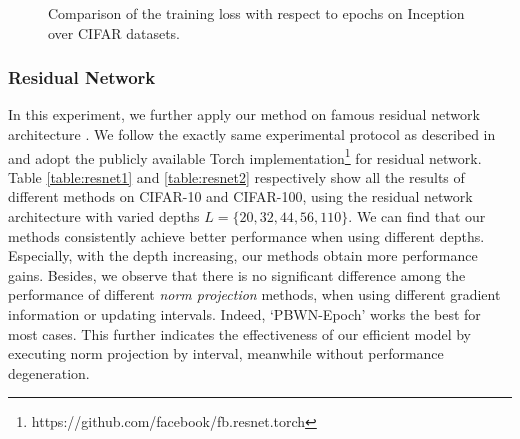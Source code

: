 \documentclass[twocolumn]{article}
\begin{document}
\begin{figure*}[t]
\centering
\hspace{-0.02\linewidth}
  \caption{\small Comparison of the training loss with respect to epochs on Inception over CIFAR datasets.}
  \label{fig:exp_Cifar}
    \vspace{-0.15in}
\end{figure*}


\subsubsection{Residual Network}
In this experiment, we further apply our method on famous residual network architecture \cite{2015_CVPR_He}. We follow the exactly same experimental protocol as described in \cite{2015_CVPR_He} and adopt the publicly available Torch implementation\footnote{https://github.com/facebook/fb.resnet.torch} for residual network. Table \ref{table:resnet1} and \ref{table:resnet2} respectively show all the results of different methods on CIFAR-10 and CIFAR-100, using the residual network architecture with varied depths $L=\{20, 32, 44, 56, 110 \}$. We can find that our methods consistently achieve better performance when using different depths. Especially, with the depth increasing, our methods obtain more performance gains. Besides, we observe that there is no significant difference among the performance of different \emph{norm projection} methods, when using different gradient information or updating intervals. Indeed, `PBWN-Epoch' works the best for most cases.  This further indicates the effectiveness of our efficient model by executing norm projection by interval, meanwhile without performance degeneration.
\end{document}
